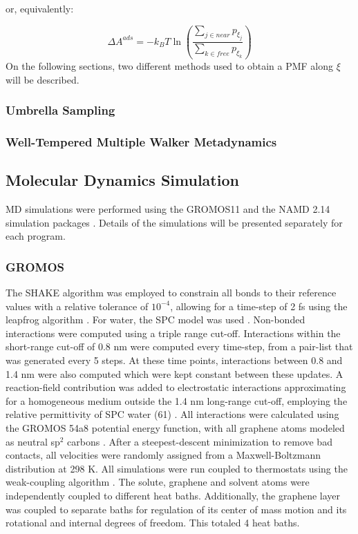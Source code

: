 \documentclass[twoside,twocolumn,9pt]{article}
\begin{document}
or, equivalently:

\begin{equation}
\label{eq:Aads-from-PMF-p}
\Delta A^{ads} = - k_B T \ln \left(\frac{\sum_{j \in near} p_{\xi_j}}{\sum_{k \in free} p_{\xi_k}}\right)
\end{equation}
On the following sections, two different methods used to obtain a PMF along $\xi$ will be described.

\subsubsection{Umbrella Sampling}

\subsubsection{Well-Tempered Multiple Walker Metadynamics}

\subsection{Molecular Dynamics Simulation}

MD simulations were performed using the GROMOS11 \cite{Riniker_2011,
  Schmid_2012} and the NAMD 2.14 simulation packages
\cite{Phillips_2020}.  Details of the simulations will be presented
separately for each program.

\subsubsection{GROMOS}

The SHAKE algorithm \cite{Ryckaert_1977} was employed to constrain all
bonds to their reference values with a relative tolerance of
$10^{-4}$, allowing for a time-step of 2 fs using the leapfrog
algorithm \cite{Hockney_1977}.  For water, the SPC model was used
\cite{Berendsen_1981}.  Non-bonded interactions were computed using a
triple range cut-off. Interactions within the short-range cut-off of
0.8 nm were computed every time-step, from a pair-list that was
generated every 5 steps.  At these time points, interactions between
0.8 and 1.4 nm were also computed which were kept constant between
these updates.  A reaction-field contribution was added to
electrostatic interactions approximating for a homogeneous medium
outside the 1.4 nm long-range cut-off, employing the relative
permittivity of SPC water (61) \cite{Tironi_1995}. All interactions
were calculated using the GROMOS 54a8 potential energy function, with
all graphene atoms modeled as neutral sp$^2$ carbons \cite{Reif_2012}.
After a steepest-descent minimization to remove bad contacts, all
velocities were randomly assigned from a Maxwell-Boltzmann
distribution at 298 K.  All simulations were run coupled to
thermostats using the weak-coupling algorithm
\cite{Berendsen_1984}. The solute, graphene and solvent atoms were
independently coupled to different heat baths. Additionally, the
graphene layer was coupled to separate baths for regulation of its
center of mass motion and its rotational and internal degrees of
freedom. This totaled 4 heat baths.
\end{document}
